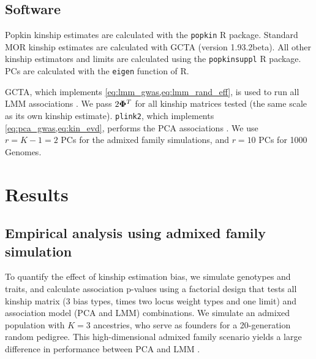 \documentclass[11pt]{article}
\newcommand{\kinMat}[1][T]{%
  \ensuremath{%
    \mathbf{\Phi}^{#1}
  }%
  \xspace%
}%
\begin{document}
\begin{linenumbers}
\subsection{Software}

Popkin kinship estimates are calculated with the \texttt{popkin} R package.
Standard MOR kinship estimates are calculated with GCTA (version 1.93.2beta).
All other kinship estimators and limits are calculated using the \texttt{popkinsuppl} R package.
PCs are calculated with the \texttt{eigen} function of R.

GCTA, which implements \cref{eq:lmm_gwas,eq:lmm_rand_eff}, is used to run all LMM associations \citep{yang_gcta:_2011, yang_advantages_2014}.
We pass $2 \kinMat$ for all kinship matrices tested (the same scale as its own kinship estimate).
\texttt{plink2}, which implements \cref{eq:pca_gwas,eq:kin_evd}, performs the PCA associations \citep{chang_second-generation_2015}.
We use $r = K - 1 = 2$ PCs for the admixed family simulations, and $r = 10$ PCs for 1000 Genomes.

\section{Results}

\subsection{Empirical analysis using admixed family simulation}

To quantify the effect of kinship estimation bias, we simulate genotypes and traits, and calculate association p-values using a factorial design that tests all kinship matrix (3 bias types, times two locus weight types and one limit) and association model (PCA and LMM) combinations.
We simulate an admixed population with $K=3$ ancestries, who serve as founders for a 20-generation random pedigree.
This high-dimensional admixed family scenario yields a large difference in performance between PCA and LMM \citep{yao_limitations_2022}.


\end{linenumbers}
\end{document}
